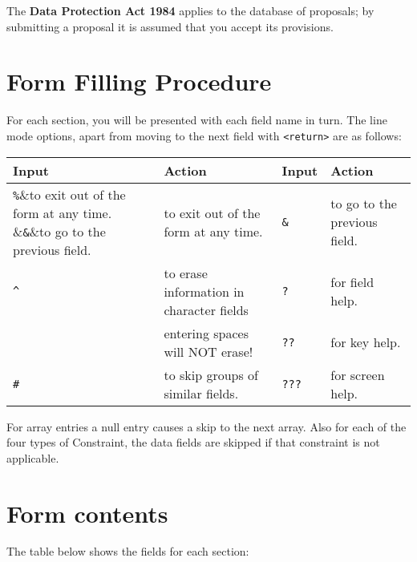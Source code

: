 The {\bf Data Protection Act 1984} applies to the database of
proposals; by submitting a proposal it is assumed that you accept its
provisions.

\section{\label{se:form_filling}Form Filling Procedure}

For each section, you will be presented with each field name in turn.
The line mode options, apart from moving to the next field
with \verb+<return>+ are as follows:

\begin{center}
\begin{tabular}{|ll|ll|} \hline
Input	&Action&Input	&Action\\ \hline
\verb+%+&to exit out of the form at any time.		&\verb+&+&to go to the previous field.\\
\verb+^+&to erase information in character fields	&\verb+?+&for field help.\\
        &entering spaces will NOT erase!		&\verb+??+&for key help.\\
\verb+#+&to skip groups of similar fields.		&\verb+???+&for screen help.\\ \hline
\end{tabular}
\end{center}

For array entries a null entry causes a skip to the next array. Also
for each of the four types of Constraint, the data fields are skipped
if that constraint is not applicable.

\sloppy

\section{\label{se:form_contents}Form contents}

The table below shows the fields for each section:

